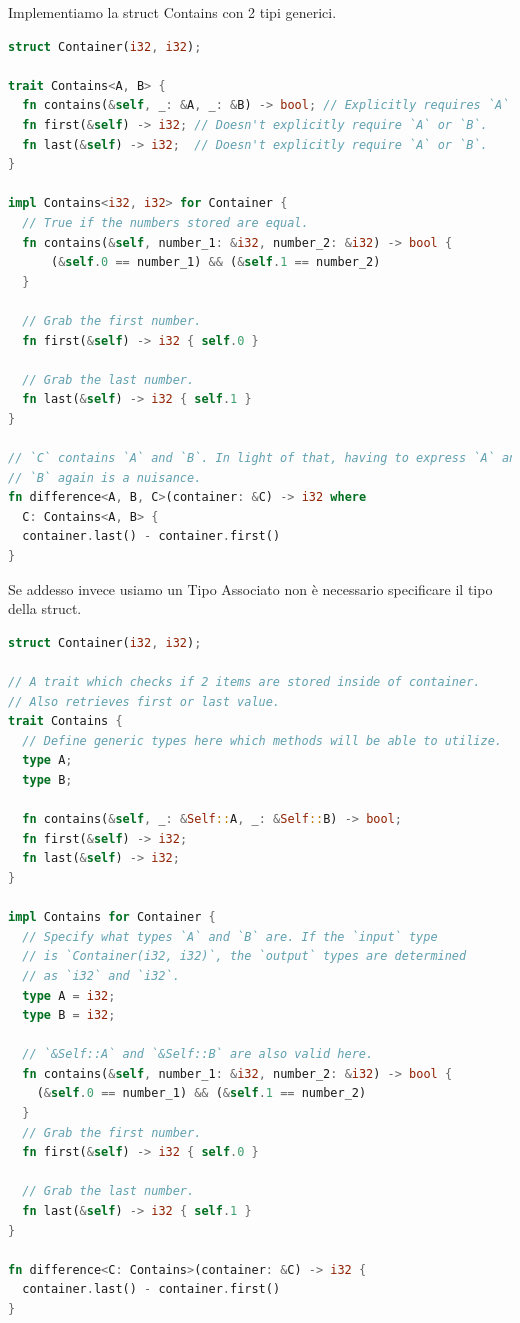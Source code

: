 \documentclass[12pt]{article}
\begin{document}
\begin{example}{}{}
  Implementiamo la struct Contains con 2 tipi generici.
  \begin{lstlisting}[language=rust]
struct Container(i32, i32);

trait Contains<A, B> {
  fn contains(&self, _: &A, _: &B) -> bool; // Explicitly requires `A` and `B`.
  fn first(&self) -> i32; // Doesn't explicitly require `A` or `B`.
  fn last(&self) -> i32;  // Doesn't explicitly require `A` or `B`.
}

impl Contains<i32, i32> for Container {
  // True if the numbers stored are equal.
  fn contains(&self, number_1: &i32, number_2: &i32) -> bool {
      (&self.0 == number_1) && (&self.1 == number_2)
  }

  // Grab the first number.
  fn first(&self) -> i32 { self.0 }

  // Grab the last number.
  fn last(&self) -> i32 { self.1 }
}

// `C` contains `A` and `B`. In light of that, having to express `A` and
// `B` again is a nuisance.
fn difference<A, B, C>(container: &C) -> i32 where
  C: Contains<A, B> {
  container.last() - container.first()
}
  \end{lstlisting}
  Se addesso invece usiamo un Tipo Associato non \`e necessario specificare il tipo della struct.
  \begin{lstlisting}[language=rust]
struct Container(i32, i32);

// A trait which checks if 2 items are stored inside of container.
// Also retrieves first or last value.
trait Contains {
  // Define generic types here which methods will be able to utilize.
  type A;
  type B;

  fn contains(&self, _: &Self::A, _: &Self::B) -> bool;
  fn first(&self) -> i32;
  fn last(&self) -> i32;
}

impl Contains for Container {
  // Specify what types `A` and `B` are. If the `input` type
  // is `Container(i32, i32)`, the `output` types are determined
  // as `i32` and `i32`.
  type A = i32;
  type B = i32;

  // `&Self::A` and `&Self::B` are also valid here.
  fn contains(&self, number_1: &i32, number_2: &i32) -> bool {
    (&self.0 == number_1) && (&self.1 == number_2)
  }
  // Grab the first number.
  fn first(&self) -> i32 { self.0 }

  // Grab the last number.
  fn last(&self) -> i32 { self.1 }
}

fn difference<C: Contains>(container: &C) -> i32 {
  container.last() - container.first()
}
  \end{lstlisting}
\end{example}
\end{document}
